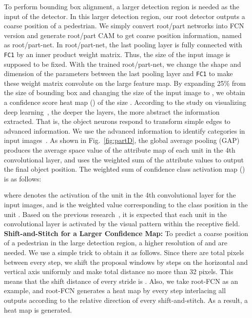 \documentclass[journal]{IEEEtran}
\begin{document}
To perform bounding box alignment, a larger detection region is needed as the input of the detector. In this larger detection region, our root detector outputs a coarse position of a pedestrian. We simply convert root/part networks into FCN version and generate root/part CAM to get coarse position information, named as root/part-net. In root/part-net, the last pooling layer is fully  connected with \verb"FC1" by an inner product weight matrix. Thus, the size of the input image is supposed to be fixed. With the trained root/part-net, we change the shape and dimension of the parameters between the last pooling layer and \verb"FC1" to make these weight matrix convolute on the large feature map. By expanding 25\% from the size of bounding box and changing the size of the input image to , we obtain a confidence score heat map () of the size  .  According to the study on visualizing deep learning~\cite{ZeilerF13Vis1, MahendranV14Vis2}, the deeper the layers, the more abstract the information extracted. That is, the object neurons respond to transform simple edges to advanced information. We use the advanced information to identify categories in input images~\cite{zhou2016learning}. As shown in Fig.~\ref{fig:partD}, the global average pooling (GAP) produces the average space value of the attribute map of each unit in the 4th convolutional layer, and uses the weighted sum of the attribute values to output the final object position. The weighted sum of confidence class activation map () is as follows:



where  denotes the activation of the unit  in the 4th convolutional layer for the input images, and  is the weighted value corresponding to the class position in the unit . Based on the previous research~\cite{zhou2016learning}, it is expected that each unit in the convolutional layer is activated by the visual pattern within the receptive field. \\

 \textbf{Shift-and-Stitch for a Larger Confidence Map:} To predict a coarse position of a pedestrian in the large detection region, a higher resolution of  and  are needed. We use a simple trick to obtain it as follows. Since there are total  pixels between every step, we shift the proposal windows by  steps on the horizontal and vertical axis uniformly and make total distance no more than 32 pixels. This means that the shift distance of every stride is . Also, we take root-FCN as an example, and root-FCN generates a  heat map by every step interlacing all  outputs according to the relative direction of every shift-and-stitch. As a result, a  heat map is generated.
\end{document}
